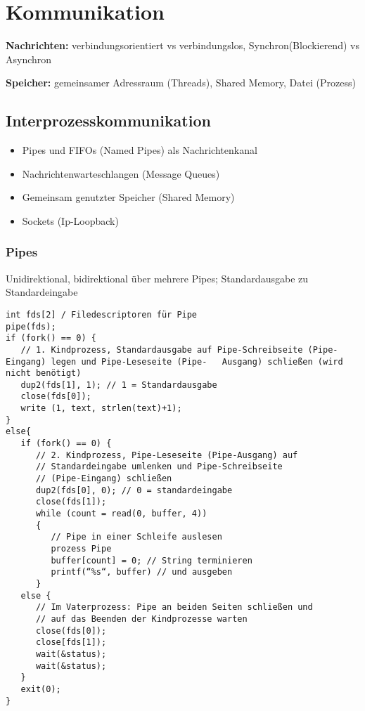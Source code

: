 \section*{Kommunikation}
\textbf{Nachrichten:} verbindungsorientiert vs verbindungslos, Synchron(Blockierend) vs Asynchron

\textbf{Speicher:} gemeinsamer Adressraum (Threads), Shared Memory, Datei (Prozess)

\subsection*{Interprozesskommunikation}
\begin{itemize}
\item Pipes und FIFOs (Named Pipes) als Nachrichtenkanal
\item Nachrichtenwarteschlangen (Message Queues)
\item Gemeinsam genutzter Speicher (Shared Memory)
\item Sockets (Ip-Loopback)
\end{itemize}

\subsubsection*{Pipes}
Unidirektional, bidirektional über mehrere Pipes; Standardausgabe zu Standardeingabe

\begin{verbatim}
int fds[2] / Filedescriptoren für Pipe
pipe(fds);
if (fork() == 0) {
   // 1. Kindprozess, Standardausgabe auf Pipe-Schreibseite (Pipe-Eingang) legen und Pipe-Leseseite (Pipe-   Ausgang) schließen (wird nicht benötigt)
   dup2(fds[1], 1); // 1 = Standardausgabe
   close(fds[0]);
   write (1, text, strlen(text)+1);
}
else{
   if (fork() == 0) {
      // 2. Kindprozess, Pipe-Leseseite (Pipe-Ausgang) auf
      // Standardeingabe umlenken und Pipe-Schreibseite
      // (Pipe-Eingang) schließen
      dup2(fds[0], 0); // 0 = standardeingabe
      close(fds[1]);
      while (count = read(0, buffer, 4))
      {
         // Pipe in einer Schleife auslesen
         prozess Pipe
         buffer[count] = 0; // String terminieren
         printf(“%s“, buffer) // und ausgeben
      }
   else {
      // Im Vaterprozess: Pipe an beiden Seiten schließen und
      // auf das Beenden der Kindprozesse warten
      close(fds[0]);
      close[fds[1]);
      wait(&status);
      wait(&status);
   }
   exit(0);
}
\end{verbatim}